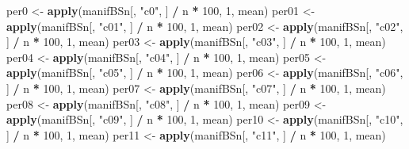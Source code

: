 \documentclass[
]{book}
\newenvironment{Shaded}{\begin{snugshade}}{\end{snugshade}}
\newcommand{\DecValTok}[1]{\textcolor[rgb]{0.00,0.00,0.81}{#1}}
\newcommand{\FunctionTok}[1]{\textcolor[rgb]{0.13,0.29,0.53}{\textbf{#1}}}
\newcommand{\NormalTok}[1]{#1}
\newcommand{\OtherTok}[1]{\textcolor[rgb]{0.56,0.35,0.01}{#1}}
\newcommand{\SpecialCharTok}[1]{\textcolor[rgb]{0.81,0.36,0.00}{\textbf{#1}}}
\newcommand{\StringTok}[1]{\textcolor[rgb]{0.31,0.60,0.02}{#1}}
\begin{document}
\begin{Shaded}
\begin{Highlighting}[]
\NormalTok{per0  }\OtherTok{\textless{}{-}} \FunctionTok{apply}\NormalTok{(manifBSn[, }\StringTok{"c0"}\NormalTok{, ]  }\SpecialCharTok{/}\NormalTok{ n }\SpecialCharTok{*} \DecValTok{100}\NormalTok{, }\DecValTok{1}\NormalTok{, mean)}
\NormalTok{per01 }\OtherTok{\textless{}{-}} \FunctionTok{apply}\NormalTok{(manifBSn[, }\StringTok{"c01"}\NormalTok{, ] }\SpecialCharTok{/}\NormalTok{ n }\SpecialCharTok{*} \DecValTok{100}\NormalTok{, }\DecValTok{1}\NormalTok{, mean)}
\NormalTok{per02 }\OtherTok{\textless{}{-}} \FunctionTok{apply}\NormalTok{(manifBSn[, }\StringTok{"c02"}\NormalTok{, ] }\SpecialCharTok{/}\NormalTok{ n }\SpecialCharTok{*} \DecValTok{100}\NormalTok{, }\DecValTok{1}\NormalTok{, mean)}
\NormalTok{per03 }\OtherTok{\textless{}{-}} \FunctionTok{apply}\NormalTok{(manifBSn[, }\StringTok{"c03"}\NormalTok{, ] }\SpecialCharTok{/}\NormalTok{ n }\SpecialCharTok{*} \DecValTok{100}\NormalTok{, }\DecValTok{1}\NormalTok{, mean)}
\NormalTok{per04 }\OtherTok{\textless{}{-}} \FunctionTok{apply}\NormalTok{(manifBSn[, }\StringTok{"c04"}\NormalTok{, ] }\SpecialCharTok{/}\NormalTok{ n }\SpecialCharTok{*} \DecValTok{100}\NormalTok{, }\DecValTok{1}\NormalTok{, mean)}
\NormalTok{per05 }\OtherTok{\textless{}{-}} \FunctionTok{apply}\NormalTok{(manifBSn[, }\StringTok{"c05"}\NormalTok{, ] }\SpecialCharTok{/}\NormalTok{ n }\SpecialCharTok{*} \DecValTok{100}\NormalTok{, }\DecValTok{1}\NormalTok{, mean)}
\NormalTok{per06 }\OtherTok{\textless{}{-}} \FunctionTok{apply}\NormalTok{(manifBSn[, }\StringTok{"c06"}\NormalTok{, ] }\SpecialCharTok{/}\NormalTok{ n }\SpecialCharTok{*} \DecValTok{100}\NormalTok{, }\DecValTok{1}\NormalTok{, mean)}
\NormalTok{per07 }\OtherTok{\textless{}{-}} \FunctionTok{apply}\NormalTok{(manifBSn[, }\StringTok{"c07"}\NormalTok{, ] }\SpecialCharTok{/}\NormalTok{ n }\SpecialCharTok{*} \DecValTok{100}\NormalTok{, }\DecValTok{1}\NormalTok{, mean)}
\NormalTok{per08 }\OtherTok{\textless{}{-}} \FunctionTok{apply}\NormalTok{(manifBSn[, }\StringTok{"c08"}\NormalTok{, ] }\SpecialCharTok{/}\NormalTok{ n }\SpecialCharTok{*} \DecValTok{100}\NormalTok{, }\DecValTok{1}\NormalTok{, mean)}
\NormalTok{per09 }\OtherTok{\textless{}{-}} \FunctionTok{apply}\NormalTok{(manifBSn[, }\StringTok{"c09"}\NormalTok{, ] }\SpecialCharTok{/}\NormalTok{ n }\SpecialCharTok{*} \DecValTok{100}\NormalTok{, }\DecValTok{1}\NormalTok{, mean)}
\NormalTok{per10 }\OtherTok{\textless{}{-}} \FunctionTok{apply}\NormalTok{(manifBSn[, }\StringTok{"c10"}\NormalTok{, ] }\SpecialCharTok{/}\NormalTok{ n }\SpecialCharTok{*} \DecValTok{100}\NormalTok{, }\DecValTok{1}\NormalTok{, mean)}
\NormalTok{per11 }\OtherTok{\textless{}{-}} \FunctionTok{apply}\NormalTok{(manifBSn[, }\StringTok{"c11"}\NormalTok{, ] }\SpecialCharTok{/}\NormalTok{ n }\SpecialCharTok{*} \DecValTok{100}\NormalTok{, }\DecValTok{1}\NormalTok{, mean)}

\end{Highlighting}
\end{Shaded}
\end{document}
